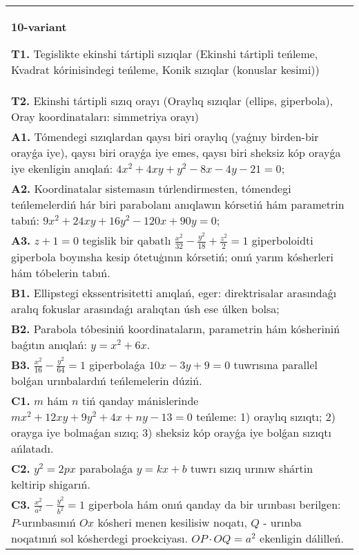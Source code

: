 \documentclass{article}
\begin{document}
\begin{tabular}{m{17cm}}
\textbf{10-variant}
\newline

\textbf{T1.} Tegislikte ekinshi tártipli sızıqlar (Ekinshi tártipli teńleme, Kvadrat kórinisindegi teńleme, Konik sızıqlar (konuslar kesimi)) \\
\textbf{T2.} Ekinshi tártipli sızıq orayı (Oraylıq sızıqlar (ellips, giperbola), Oray koordinataları: simmetriya orayı) \\
\textbf{A1.} Tómendegi sızıqlardan qaysı biri oraylıq (yaǵnıy birden-bir orayǵa iye), qaysı biri orayǵa iye emes, qaysı biri sheksiz kóp orayǵa iye ekenligin anıqlań:  $4 x^2+4 x y+y^2-8 x-4 y-21=0$; \\
\textbf{A2.} Koordinatalar sistemasın túrlendirmesten, tómendegi teńlemelerdiń hár biri parabolanı anıqlawın kórsetiń hám parametrin tabıń: $9 x^2+24 x y+16 y^2-120 x+90 y=0$; \\
\textbf{A3.} $z+1=0$ tegislik bir qabatlı $\frac{x^2}{32}-\frac{y^2}{18}+\frac{z^2}{2}=1$ giperboloidti giperbola boyınsha kesip ótetuģının kórsetiń; onıń yarım kósherleri hám tóbelerin tabıń. \\
\textbf{B1.} Ellipstegi ekssentrisitetti anıqlań, eger: direktrisalar arasındaǵı aralıq fokuslar arasındaǵı aralıqtan úsh ese úlken bolsa; \\
\textbf{B2.} Parabola tóbesiniń koordinataların, parametrin hám kósheriniń baǵıtın anıqlań: $y=x^2+6 x$. \\
\textbf{B3.} $\frac{x^2}{16}-\frac{y^2}{64}=1$ giperbolaǵa $10 x-3 y+9=0$ tuwrısına parallel bolǵan urınbalardıń teńlemelerin dúziń. \\
\textbf{C1.} $m$ hám $n$ tiń qanday mánislerinde $m x^2+12 x y+9 y^2+4 x+n y-13=0$ teńleme: 1) oraylıq sızıqtı; 2) orayga iye bolmaǵan sızıq; 3) sheksiz kóp orayǵa iye bolǵan sızıqtı ańlatadı. \\
\textbf{C2.} $y^2=2 p x$ parabolaǵa $y=k x+b$ tuwrı sızıq urınıw shártin keltirip shigarıń. \\
\textbf{C3.} $\frac{x^2}{a^2}-\frac{y^2}{b^2}=1$ giperbola hám onıń qanday da bir urınbası berilgen: $P$-urınbasınıń $O x$ kósheri menen kesilisiw noqatı, $Q$ - urınba noqatınıń sol kósherdegi proekciyası. $O P \cdot O Q=a^2$ ekenligin dálilleń. \\

\end{tabular}
\vspace{1cm}
\end{document}
